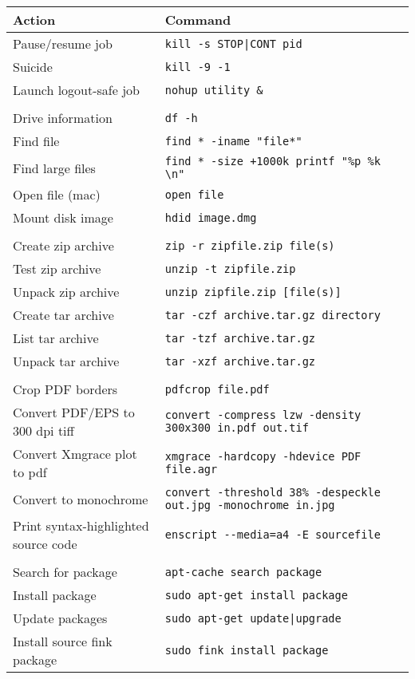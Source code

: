 \documentclass[a4paper,10pt]{article}
\begin{document}
\begin{table}
\begin{tabular}{ll}\hline\hline
Action              & Command \\\hline
Pause/resume job    & \verb"kill -s STOP|CONT pid" \\
Suicide             & \verb"kill -9 -1"\\
Launch logout-safe job  & \verb"nohup utility &" \\
\\
Drive information   & \verb"df -h"\\
Find file           & \verb'find * -iname "file*"'\\
Find large files    & \verb'find * -size +1000k printf "%p %k \n"'\\
Open file (mac)     & \verb"open file"\\
Mount disk image    & \verb"hdid image.dmg"\\
\\
Create zip archive  & \verb"zip -r zipfile.zip file(s)"\\
Test zip archive    & \verb"unzip -t zipfile.zip"\\
Unpack zip archive  & \verb"unzip zipfile.zip [file(s)]"\\
Create tar archive  & \verb"tar -czf archive.tar.gz directory"\\
List tar archive    & \verb"tar -tzf archive.tar.gz"\\
Unpack tar archive  & \verb"tar -xzf archive.tar.gz"\\
\\
Crop PDF borders & \verb"pdfcrop file.pdf" \\
Convert PDF/EPS to 300 dpi tiff & \verb"convert -compress lzw -density 300x300 in.pdf out.tif" \\
Convert Xmgrace plot to pdf     & \verb"xmgrace -hardcopy -hdevice PDF file.agr"\\
Convert to monochrome           & \verb"convert -threshold 38% -despeckle out.jpg -monochrome in.jpg"\\
Print syntax-highlighted source code & \verb"enscript --media=a4 -E sourcefile"\\
\\
Search for package  & \verb"apt-cache search package"\\
Install package     & \verb"sudo apt-get install package"\\
Update packages     &  \verb"sudo apt-get update|upgrade"\\
Install source fink package & \verb"sudo fink install package"\\

\end{tabular}
\end{table}
\end{document}
